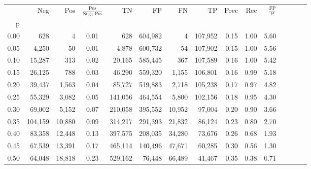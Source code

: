 \begin{tabular}{rrrcrrrrrrrrrrr}
\toprule
{} &      Neg &     Pos & $\frac{\text{Pos}}{\text{Neg}+\text{Pos}}$ &       TN &       FP &       FN &       TP &  Prec &   Rec & $\frac{\text{FP}}{\text{P}}$ \\
p    &          &         &                                            &          &          &          &          &       &       &                              \\
\midrule
0.00 &      628 &       4 &                                       0.01 &      628 &  604,982 &        4 &  107,952 &  0.15 &  1.00 &                         5.60 \\
0.05 &    4,250 &      50 &                                       0.01 &    4,878 &  600,732 &       54 &  107,902 &  0.15 &  1.00 &                         5.56 \\
0.10 &   15,287 &     313 &                                       0.02 &   20,165 &  585,445 &      367 &  107,589 &  0.16 &  1.00 &                         5.42 \\
0.15 &   26,125 &     788 &                                       0.03 &   46,290 &  559,320 &    1,155 &  106,801 &  0.16 &  0.99 &                         5.18 \\
0.20 &   39,437 &   1,563 &                                       0.04 &   85,727 &  519,883 &    2,718 &  105,238 &  0.17 &  0.97 &                         4.82 \\
0.25 &   55,329 &   3,082 &                                       0.05 &  141,056 &  464,554 &    5,800 &  102,156 &  0.18 &  0.95 &                         4.30 \\
0.30 &   69,002 &   5,152 &                                       0.07 &  210,058 &  395,552 &   10,952 &   97,004 &  0.20 &  0.90 &                         3.66 \\
0.35 &  104,159 &  10,880 &                                       0.09 &  314,217 &  291,393 &   21,832 &   86,124 &  0.23 &  0.80 &                         2.70 \\
0.40 &   83,358 &  12,448 &                                       0.13 &  397,575 &  208,035 &   34,280 &   73,676 &  0.26 &  0.68 &                         1.93 \\
0.45 &   67,539 &  13,391 &                                       0.17 &  465,114 &  140,496 &   47,671 &   60,285 &  0.30 &  0.56 &                         1.30 \\
0.50 &   64,048 &  18,818 &                                       0.23 &  529,162 &   76,448 &   66,489 &   41,467 &  0.35 &  0.38 &                         0.71 \\

\end{tabular}
